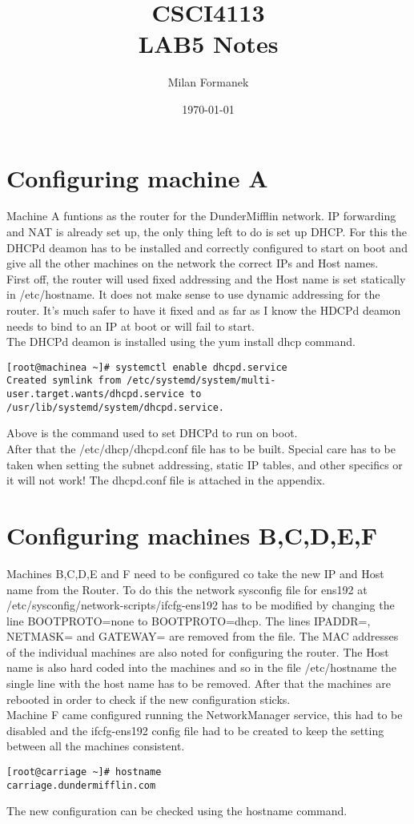 \documentclass[11pt,onside]{article}
\title{\blue CSCI4113 \\
\blueb LAB5 Notes}
\author{Milan Formanek}
\date{\today} %
\begin{document}
\maketitle

\section{Configuring machine A}
Machine A funtions as the router for the DunderMifflin network. IP forwarding and NAT is already set up, the only thing left to do is set up DHCP. For this the DHCPd deamon has to be installed and correctly configured to start on boot and give all the other machines on the network the correct IPs and Host names.\\
First off, the router will used fixed addressing and the Host name is set statically in /etc/hostname. It does not make sense to use dynamic addressing for the router. It's much safer to have it fixed and as far as I know the HDCPd deamon needs to bind to an IP at boot or will fail to start.\\
The DHCPd deamon is installed using the yum install dhcp command.
\begin{lstlisting}
[root@machinea ~]# systemctl enable dhcpd.service
Created symlink from /etc/systemd/system/multi-user.target.wants/dhcpd.service to /usr/lib/systemd/system/dhcpd.service.
\end{lstlisting}
Above is the command used to set DHCPd to run on boot.\\
After that the /etc/dhcp/dhcpd.conf file has to be built. Special care has to be taken when setting the subnet addressing, static IP tables, and other specifics or it will not work! The dhcpd.conf file is attached in the appendix.
\section{Configuring machines B,C,D,E,F}
Machines B,C,D,E and F need to be configured co take the new IP and Host name from the Router. To do this the network sysconfig file for ens192 at /etc/sysconfig/network-scripts/ifcfg-ens192 has to be modified by changing the line BOOTPROTO=none to BOOTPROTO=dhcp. The lines IPADDR=, NETMASK= and GATEWAY= are removed from the file. The MAC addresses of the individual machines are also noted for configuring the router. The Host name is also hard coded into the machines and so in the file /etc/hostname the single line with the host name has to be removed. After that the machines are rebooted in order to check if the new configuration sticks.\\
Machine F came configured running the NetworkManager service, this had to be disabled and the ifcfg-ens192 config file had to be created to keep the setting between all the machines consistent.
\clearpage
\begin{lstlisting}
[root@carriage ~]# hostname
carriage.dundermifflin.com
\end{lstlisting}
The new configuration can be checked using the hostname command.
\end{document}
